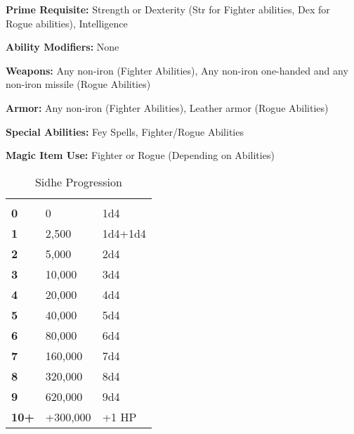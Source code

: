 \begin{multicols*}{2}
{\textbf{Prime Requisite:} Strength or Dexterity (Str for Fighter abilities, Dex for Rogue abilities), Intelligence

\textbf{Ability Modifiers:} None

\textbf{Weapons:} Any non-iron (Fighter Abilities), Any non-iron one-handed and any non-iron missile (Rogue Abilities)

\textbf{Armor:} Any non-iron (Fighter Abilities), Leather armor (Rogue Abilities)

\textbf{Special Abilities:} Fey Spells, Fighter/Rogue Abilities

\textbf{Magic Item Use:} Fighter or Rogue (Depending on Abilities)}

\begin {table}[H]
  \caption{Sidhe Progression}
  \begin{tabularx}{\columnwidth}{>{\bfseries}YYY}
   &  & \\
	0 & 0 & 1d4\\
	1 & 2,500 & 1d4+1d4\\
	2 & 5,000 & 2d4\\
	3 & 10,000 & 3d4\\
	4 & 20,000 & 4d4\\
	5 & 40,000 & 5d4\\
	6 & 80,000 & 6d4\\
	7 & 160,000 & 7d4\\
	8 & 320,000 & 8d4\\
	9 & 620,000 & 9d4\\
	10+ & +300,000 & +1 HP
  \end {tabularx}
\end {table}


\end{multicols*}
